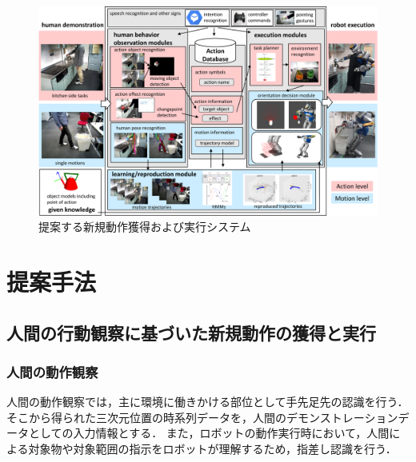 \documentclass[twocolumn]{preport}
\begin{document}
\begin{figure}[htbp]
  \begin{center}
    \includegraphics[width=1.0\columnwidth]{figs/system_approach_new}
    \caption{提案する新規動作獲得および実行システム}
    \label{figure:approach}
  \end{center}
\end{figure}

\section{提案手法}

\subsection{人間の行動観察に基づいた新規動作の獲得と実行}
\subsubsection{人間の動作観察}
人間の動作観察では，主に環境に働きかける部位として手先足先の認識を行う．
そこから得られた三次元位置の時系列データを，人間のデモンストレーションデータとしての入力情報とする．
また，ロボットの動作実行時において，人間による対象物や対象範囲の指示をロボットが理解するため，指差し認識を行う．
\end{document}
